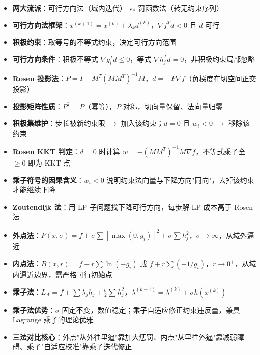\begin{itemize}
  \item \textbf{两大流派}：可行方向法（域内迭代） vs 罚函数法（转无约束序列）
  \item \textbf{可行方向法框架}：$x^{(k+1)} = x^{(k)} + \lambda_k d^{(k)}$，$\nabla f^T d < 0$ 且 $d$ 可行
  \item \textbf{积极约束}：取等号的不等式约束，决定可行方向范围
  \item \textbf{可行方向条件}：积极不等式 $\nabla g_i^T d \le 0$，等式 $\nabla h_j^T d = 0$，非积极约束局部忽略
  \item \textbf{Rosen 投影法}：$P = I - M^T(MM^T)^{-1}M$，$d = -P\nabla f$（负梯度在切空间正交投影）
  \item \textbf{投影矩阵性质}：$P^2=P$（幂等），$P$ 对称，切向量保留、法向量归零
  \item \textbf{积极集维护}：步长被新约束限 $\to$ 加入该约束；$d=0$ 且 $w_i < 0$ $\to$ 移除该约束
  \item \textbf{Rosen KKT 判定}：$d=0$ 时计算 $w = -(MM^T)^{-1}M\nabla f$，不等式乘子全 $\ge 0$ 即为 KKT 点
  \item \textbf{乘子符号的因果含义}：$w_i < 0$ 说明约束法向量与下降方向"同向"，去掉该约束才能继续下降
  \item \textbf{Zoutendijk 法}：用 LP 子问题找下降可行方向，每步解 LP 成本高于 Rosen 法
  \item \textbf{外点法}：$P(x,\sigma) = f + \sigma\sum[\max(0,g_i)]^2 + \sigma\sum h_j^2$，$\sigma \to \infty$，从域外逼近
  \item \textbf{内点法}：$B(x,r) = f - r\sum\ln(-g_i)$ 或 $f + r\sum(-1/g_i)$，$r \to 0^+$，从域内逼近边界，需严格可行初始点
  \item \textbf{乘子法}：$L_A = f + \sum\lambda_j h_j + \frac{\sigma}{2}\sum h_j^2$，$\lambda^{(k+1)} = \lambda^{(k)} + \sigma h(x^{(k)})$
  \item \textbf{乘子法优势}：$\sigma$ 固定不变，数值稳定；乘子自适应修正约束违反量，兼具 Lagrange 乘子的理论优雅
  \item \textbf{三法对比核心}：外点"从外往里逼"靠加大惩罚、内点"从里往外逼"靠减弱障碍、乘子"自适应校准"靠乘子迭代修正
\end{itemize}
